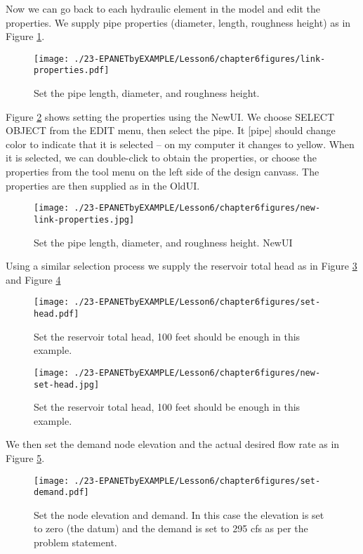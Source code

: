 Now we can go back to each hydraulic element in the model and edit the properties.  We supply pipe properties (diameter, length, roughness height) as in Figure \ref{fig:link-properties}.
\begin{figure}[h!] %
   \centering
   \texttt{[image: ./23-EPANETbyEXAMPLE/Lesson6/chapter6figures/link-properties.pdf]} 
   \caption{Set the pipe length, diameter, and roughness height.}
   \label{fig:link-properties}
\end{figure}
Figure \ref{fig:new-link-properties} shows setting the properties using the NewUI.
We choose SELECT OBJECT from the EDIT menu, then select the pipe.  
It [pipe] should change color to indicate that it is selected -- on my computer it changes to yellow.
When it is selected, we can double-click to obtain the properties, or choose the properties from the tool menu on the left side of the design canvass. The properties are then supplied as in the OldUI.
\begin{figure}[h!] %
   \centering
   \texttt{[image: ./23-EPANETbyEXAMPLE/Lesson6/chapter6figures/new-link-properties.jpg]} 
   \caption{Set the pipe length, diameter, and roughness height.  NewUI}
   \label{fig:new-link-properties}
\end{figure}
\newpage
Using a similar selection process we supply the reservoir total head as in Figure \ref{fig:set-head} and Figure \ref{fig:new-set-head}
\begin{figure}[h!] %
   \centering
   \texttt{[image: ./23-EPANETbyEXAMPLE/Lesson6/chapter6figures/set-head.pdf]} 
   \caption{Set the reservoir total head, 100 feet should be enough in this example.}
   \label{fig:set-head}
\end{figure}
\clearpage
\begin{figure}[h!] %
   \centering
   \texttt{[image: ./23-EPANETbyEXAMPLE/Lesson6/chapter6figures/new-set-head.jpg]} 
   \caption{Set the reservoir total head, 100 feet should be enough in this example.}
   \label{fig:new-set-head}
\end{figure}
We then set the demand node elevation and the actual desired flow rate as in Figure \ref{fig:set-demand}.
\begin{figure}[h!] %
   \centering
   \texttt{[image: ./23-EPANETbyEXAMPLE/Lesson6/chapter6figures/set-demand.pdf]} 
   \caption{Set the node elevation and demand.  In this case the elevation is set to zero (the datum) and the demand is set to 295 cfs as per the problem statement.}
   \label{fig:set-demand}
\end{figure}
